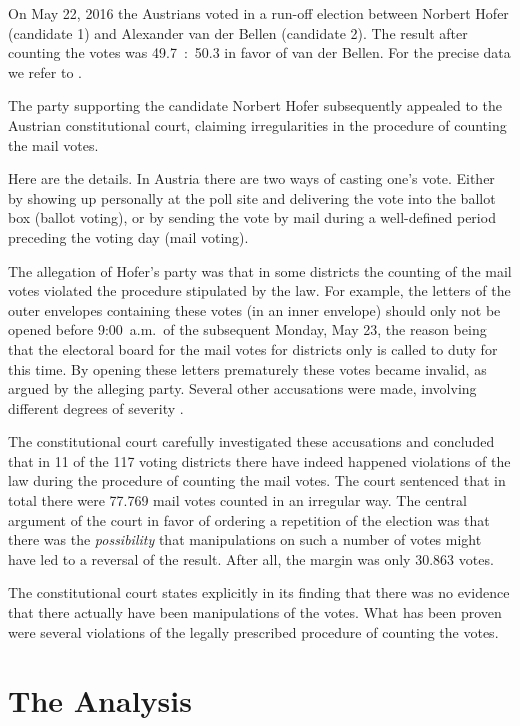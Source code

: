 \documentclass[12pt,a4paper]{article}
\theoremstyle{definition}
\begin{document}
On May 22, 2016 the Austrians voted in a run-off election between Norbert Hofer (candidate 1) and Alexander van der Bellen (candidate 2). The result after counting the votes was 49.7~:~50.3 in favor of van der Bellen. For the precise data we refer to \cite{wahl16}. 

The party supporting the candidate Norbert Hofer subsequently appealed to the Austrian constitutional court, claiming irregularities in the procedure of counting the mail votes.

Here are the details. In Austria there are two ways of casting one's vote. Either by showing up personally at the poll site and delivering the vote into the ballot box (ballot voting), or by sending the vote by mail during a well-defined period preceding the voting day (mail voting).

The allegation of Hofer's party was that in some districts the counting of the mail votes violated the procedure stipulated by the law. For example, the letters of the outer envelopes containing these votes (in an inner envelope) should only not be opened before 9:00~a.m.~of the subsequent Monday, May 23,
the reason being that the electoral board for the mail votes for districts only is called to duty for this time. By opening these letters prematurely these votes became invalid, as argued by the alleging party. Several other accusations were made, involving different degrees of severity \cite{vfgh}.



The constitutional court carefully investigated these accusations and concluded that in 11 of the 117 voting districts there have indeed happened violations of the law during the procedure of counting the mail votes. The court sentenced that in total there were 77.769 mail votes counted in an irregular way. The central argument of the court in favor of ordering a repetition of the election was that there was the {\it possibility} that manipulations on such a number of votes might have led to a reversal of the result. After all, the margin was only 30.863 votes.

The constitutional court states explicitly in its finding that there was no evidence that there actually have been  manipulations of the votes. What has been proven were several violations of the legally prescribed procedure of counting the votes.

\section{The Analysis}
\end{document}
